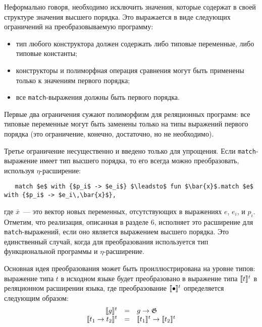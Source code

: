 Неформально говоря, необходимо исключить значения, которые содержат в своей структуре значения высшего порядка.
Это выражается в виде следующих ограничений на преобразовываемую программу:

\begin{itemize}
  \item тип любого конструктора должен содержать либо типовые переменные, либо типовые константы;
  \item конструкторы и полиморфная операция сравнения могут быть применены только к значениям первого порядка;
  \item все \lstinline|match|-выражения должны быть первого порядка.
\end{itemize}


Первые два ограничения сужают полиморфизм для реляционных программ: все типовые переменные могут быть заменены только на типы выражений первого порядка (это ограничение, конечно, достаточно, но не необходимо).

Третье ограничение несущественно и введено только для упрощения. Если \lstinline|match|-выражение имеет тип высшего порядка, то его всегда можно преобразовать, используя $\eta$-расширение:

\begin{lstlisting}
   match $e$ with {$p_i$ -> $e_i$} $\leadsto$ fun $\bar{x}$.match $e$ with {$p_i$ -> $e_i\,\bar{x}$},
\end{lstlisting}

\noindent где $\bar{x}$~--- это вектор новых переменных, отсутствующих в выражениях $e$, $e_i$, и $p_i$. Отметим, что реализация, описанная в разделе 6, исполняет это расширение для \lstinline|match|-выражений, если оно является выражением высшего порядка. Это единственный случай, когда для преобразования используется тип функциональной программы и $\eta$-расширение.

Основная идея преобразования может быть проиллюстрирована на уровне типов: выражение типа $t$ в исходном языке будет преобразовано в выражение типа $\llbracket{t}\rrbracket^t$ в реляционном расширении языка, где преобразование $\llbracket{\bullet}\rrbracket^t$ определяется следующим образом:
$$
\begin{array}{rcl}
\llbracket{g}\rrbracket^t                     & = & g \to \mathfrak G \\
\llbracket{t_1 \to t_2}\rrbracket^t           & = & \llbracket{t_1}\rrbracket^t \to \llbracket{t_2}\rrbracket^t \\
\end{array}
$$

